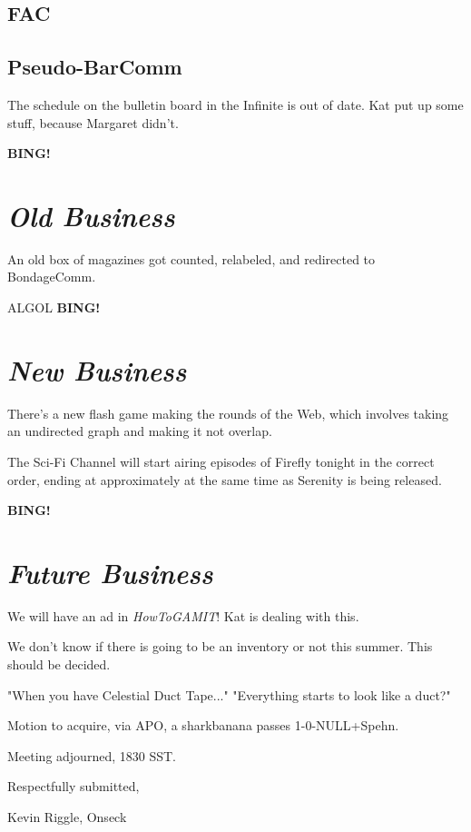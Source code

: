 \documentclass[10pt]{article}
\newcommand{\bing}{{\bf BING!} }
\newcommand{\goto}[1]{\bing \vskip 12pt \section*{{\em{#1}}}}
\begin{document}
\subsection*{FAC}

\subsection*{Pseudo-BarComm}
The schedule on the bulletin board in the Infinite is out of date.  Kat put up some stuff, because Margaret didn't.

\goto{Old Business}
An old box of magazines got counted, relabeled, and redirected to BondageComm.

ALGOL
\goto{New Business}
There's a new flash game making the rounds of the Web, which involves taking an undirected graph and making it not overlap.

The Sci-Fi Channel will start airing episodes of Firefly tonight in the correct order, ending at approximately at
the same time as Serenity is being released.

\goto{Future Business}

We will have an ad in \emph{HowToGAMIT}!  Kat is dealing with this.

We don't know if there is going to be an inventory or not this summer.  This should be decided.

"When you have Celestial Duct Tape..."  "Everything starts to look like a duct?"

Motion to acquire, via APO, a sharkbanana passes 1-0-NULL+Spehn.

\vspace{12pt}

\noindent
Meeting adjourned, 1830 SST.

\vspace{18pt}

\centerline{Respectfully submitted,}
\centerline{Kevin Riggle, Onseck}
\end{document}
